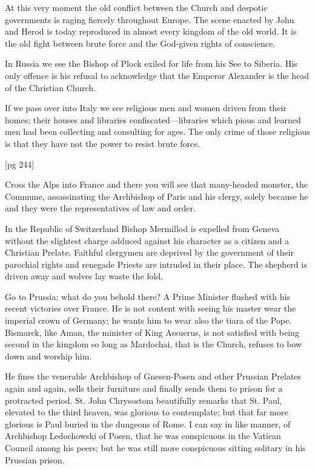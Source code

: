 At this very moment the old conflict between
the Church and despotic governments is raging
fiercely throughout Europe. The scene enacted by
John and Herod is today reproduced in almost
every kingdom of the old world. It is the old
fight between brute force and the God-given rights
of conscience.

In Russia we see the Bishop of Plock exiled for
life from his See to Siberia. His only offence is
his refusal to acknowledge that the Emperor Alexander
is the head of the Christian Church.

If we pass over into Italy we see religious men
and women driven from their homes; their houses
and libraries confiscated—libraries which pious
and learned men had been collecting and consulting
for ages. The only crime of those religious
is that they have not the power to resist brute
force.

[pg 244]

Cross the Alps into France and there you will see
that many-headed monster, the Commune, assassinating
the Archbishop of Paris and his clergy,
solely because he and they were the representatives
of law and order.

In the Republic of Switzerland Bishop Mermillod
is expelled from Geneva without the slightest
charge adduced against his character as a citizen
and a Christian Prelate. Faithful clergymen are
deprived by the government of their parochial
rights and renegade Priests are intruded in their
place. The shepherd is driven away and wolves
lay waste the fold.

Go to Prussia; what do you behold there? A
Prime Minister flushed with his recent victories
over France. He is not content with seeing his
master wear the imperial crown of Germany; he
wants him to wear also the tiara of the Pope.
Bismarck, like Aman, the minister of King Assuerus,
is not satisfied with being second in the
kingdom so long as Mardochai, that is the Church,
refuses to bow down and worship him.

He fines the venerable Archbishop of Gnesen-Posen
and other Prussian Prelates again and
again, sells their furniture and finally sends them
to prison for a protracted period. St. John Chrysostom
beautifully remarks that St. Paul, elevated
to the third heaven, was glorious to contemplate;
but that far more glorious is Paul buried in the
dungeons of Rome. I can say in like manner, of
Archbishop Ledochowski of Posen, that he was
conspicuous in the Vatican Council among his
peers; but he was still more conspicuous sitting
solitary in his Prussian prison.

